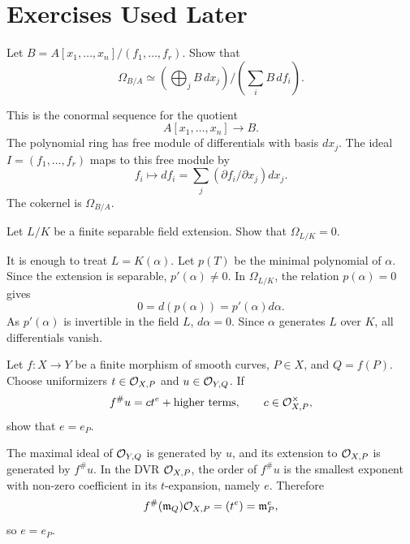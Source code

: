 \section{Exercises Used Later}

\begin{exercise}\label{ex:differentials-quotient}
Let \(B=A[x_1,\ldots,x_n]/(f_1,\ldots,f_r)\).  Show that
\[
    \Omega_{B/A}
    \simeq
    \left(\bigoplus_j B\,dx_j\right)\Big/
    \left(\sum_i B\,df_i\right).
\]
\end{exercise}

\begin{solution}
This is the conormal sequence for the quotient
\[
    A[x_1,\ldots,x_n]\to B.
\]
The polynomial ring has free module of differentials with basis \(dx_j\).  The
ideal \(I=(f_1,\ldots,f_r)\) maps to this free module by
\[
    f_i\longmapsto df_i=\sum_j(\partial f_i/\partial x_j)dx_j.
\]
The cokernel is \(\Omega_{B/A}\).
\end{solution}

\begin{exercise}\label{ex:separable-no-differentials}
Let \(L/K\) be a finite separable field extension.  Show that
\(\Omega_{L/K}=0\).
\end{exercise}

\begin{solution}
It is enough to treat \(L=K(\alpha)\).  Let \(p(T)\) be the minimal polynomial
of \(\alpha\).  Since the extension is separable, \(p'(\alpha)\ne0\).  In
\(\Omega_{L/K}\), the relation \(p(\alpha)=0\) gives
\[
    0=d(p(\alpha))=p'(\alpha)d\alpha.
\]
As \(p'(\alpha)\) is invertible in the field \(L\), \(d\alpha=0\).  Since
\(\alpha\) generates \(L\) over \(K\), all differentials vanish.
\end{solution}

\begin{exercise}\label{ex:ramification-local}
Let \(f:X\to Y\) be a finite morphism of smooth curves, \(P\in X\), and
\(Q=f(P)\).  Choose uniformizers \(t\in\mathcal{O}_{X,P}\) and \(u\in\mathcal{O}_{Y,Q}\).  If
\[
    f^\#u=c t^e+\text{higher terms},\qquad c\in\mathcal{O}_{X,P}^\times,
\]
show that \(e=e_P\).
\end{exercise}

\begin{solution}
The maximal ideal of \(\mathcal{O}_{Y,Q}\) is generated by \(u\), and its extension to
\(\mathcal{O}_{X,P}\) is generated by \(f^\#u\).  In the DVR \(\mathcal{O}_{X,P}\), the order
of \(f^\#u\) is the smallest exponent with non-zero coefficient in its
\(t\)-expansion, namely \(e\).  Therefore
\[
    f^\#(\mathfrak m_Q)\mathcal{O}_{X,P}=(t^e)=\mathfrak m_P^e,
\]
so \(e=e_P\).
\end{solution}
